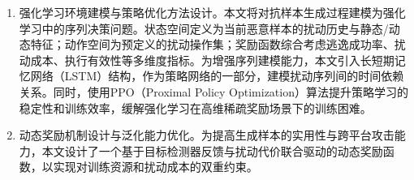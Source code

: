 \begin{enumerate} [label=\arabic*)]
\item 强化学习环境建模与策略优化方法设计。本文将对抗样本生成过程建模为强化学习中的序列决策问题。状态空间定义为当前恶意样本的扰动历史与静态/动态特征；动作空间为预定义的扰动操作集；奖励函数综合考虑逃逸成功率、扰动成本、执行有效性等多维度指标。为增强序列建模能力，本文引入长短期记忆网络（LSTM）结构，作为策略网络的一部分，建模扰动序列间的时间依赖关系。同时，使用PPO（Proximal Policy Optimization）算法提升策略学习的稳定性和训练效率，缓解强化学习在高维稀疏奖励场景下的训练困难。

\item 动态奖励机制设计与泛化能力优化。为提高生成样本的实用性与跨平台攻击能力，本文设计了一个基于目标检测器反馈与扰动代价联合驱动的动态奖励函数，以实现对训练资源和扰动成本的双重约束。		

\end{enumerate}

